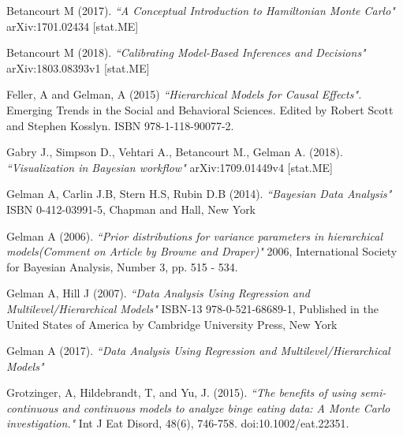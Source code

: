 \documentclass{article}
\begin{document}
\iffalse
\begin{thebibliography}{9}

Betancourt M (2017).
\textit{``A Conceptual Introduction to Hamiltonian Monte Carlo"} 
arXiv:1701.02434 [stat.ME]

Betancourt M (2018).
\textit{``Calibrating Model-Based Inferences and Decisions"} 
arXiv:1803.08393v1 [stat.ME]

Feller, A and Gelman, A (2015) \textit{``Hierarchical Models for Causal Effects".}
Emerging Trends in the Social and Behavioral Sciences. Edited by Robert Scott and Stephen Kosslyn. ISBN 978-1-118-90077-2.

Gabry J., Simpson D., Vehtari A., Betancourt M., Gelman A. (2018).
\textit{``Visualization in Bayesian workflow"} 
arXiv:1709.01449v4 [stat.ME]

Gelman A, Carlin J.B, Stern H.S, Rubin D.B (2014).
\textit{``Bayesian Data Analysis"}
ISBN 0-412-03991-5, Chapman and Hall, New York

Gelman A (2006).
\textit{``Prior distributions for variance parameters in hierarchical models(Comment on Article by Browne and Draper)"}
2006, International Society for Bayesian Analysis, Number 3, pp. 515 - 534.

Gelman A, Hill J (2007).
\textit{``Data Analysis Using Regression and Multilevel/Hierarchical Models"}
ISBN-13 978-0-521-68689-1, Published in the United States of America by Cambridge University Press, New York

Gelman A (2017).
\textit{``Data Analysis Using Regression and Multilevel/Hierarchical Models"}

Grotzinger, A, Hildebrandt, T, and Yu, J. (2015). 
\textit{``The benefits of using semi-continuous and continuous models to analyze binge eating data: A Monte Carlo investigation."}
 Int J Eat Disord, 48(6), 746-758. doi:10.1002/eat.22351.
 

\end{thebibliography}
\end{document}

